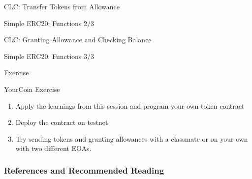 \documentclass[handout]{beamer}
\begin{document}
\begin{frame}{CLC: Transfer Tokens from Allowance}

	\begin{samplecode}{Simple ERC20: Functions 2/3}
		
	\end{samplecode}

\end{frame}

\begin{frame}{CLC: Granting Allowance and Checking Balance}

	\begin{samplecode}{Simple ERC20: Functions 3/3}
		
	\end{samplecode}

\end{frame}


\begin{frame}{Exercise}

\begin{exercise}{YourCoin Exercise}
\begin{enumerate}
	\item	Apply the learnings from this session and program your own token contract
	\item	Deploy the contract on testnet
	\item 	Try sending tokens and granting allowances with a classmate or on your own with two different EOAs.
\end{enumerate}
\end{exercise}					

\end{frame}


\begin{frame}%
\frametitle{References and Recommended Reading}
	
	
\end{frame}
\end{document}
